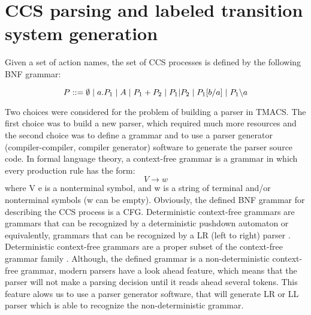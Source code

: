 \section{CCS parsing and labeled transition system generation}
\label{sec:parsing}

Given a set of action names, the set of CCS processes is defined by the following BNF grammar:

\begin{equation}\label{eq:ccs_bnf}
P ::= \emptyset \hspace{1 mm} | \hspace{1 mm} a.P_{1} \hspace{1 mm} | \hspace{1 mm} A \hspace{1 mm} | \hspace{1 mm}P_{1}+P_{2} \hspace{1 mm} |
\hspace{1 mm} P_{1} | P_{2} \hspace{1 mm} | \hspace{1 mm} P_{1}[b/a] \hspace{1 mm} | \hspace{1 mm} P_{1} \backslash a
\end{equation}

Two choices were considered for the problem of building a parser in TMACS. The first choice was to build
a new parser, which required much more resources and the second choice was to define a grammar
and to use a parser generator (compiler-compiler, compiler generator) software to generate the parser source code.
In formal language theory, a context-free grammar \cite{Chomsky} is a grammar in which every production 
rule has the form:
\[V \rightarrow w \]
where V e is a nonterminal symbol, and w is a string of terminal and/or nonterminal symbols 
(w can be empty). Obviously, the defined BNF grammar for describing the CCS process is a CFG. 
Deterministic context-free grammars \cite{Chomsky} are grammars that can be recognized by a 
deterministic pushdown automaton or equivalently, grammars that can be recognized by a LR (left to right) 
parser \cite{Compilers}. Deterministic context-free grammars are a proper subset of the context-free grammar 
family \cite{Chomsky}. Although, the defined grammar is a non-deterministic context-free grammar, modern parsers have a 
look ahead feature, which means that the parser will not make a parsing decision until it reads ahead several tokens. 
This feature alows us to use a parser generator software, that will generate LR or LL parser which is able to
recognize the non-deterministic grammar.


